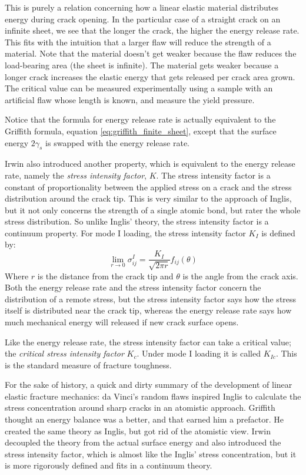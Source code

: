 This is purely a relation concerning how a linear elastic material distributes energy during crack opening. In the particular case of a straight crack on an infinite sheet, we see that the longer the crack, the higher the energy release rate. This fits with the intuition that a larger flaw will reduce the strength of a material. Note that the material doesn't get weaker because the flaw reduces the load-bearing area (the sheet is infinite). The material gets weaker because a longer crack increases the elastic energy that gets released per crack area grown. The critical value can be measured experimentally using a sample with an artificial flaw whose length is known, and measure the yield pressure. 

Notice that the formula for energy release rate is actually equivalent to the Griffith formula, equation \ref{eq:griffith_finite_sheet}, except that the surface energy $2\gamma_s$ is swapped with the energy release rate.

Irwin also introduced another property, which is equivalent to the energy release rate, namely the \emph{stress intensity factor}, $K$. The stress intensity factor is a constant of proportionality between the applied stress on a crack and the stress distribution around the crack tip. This is very similar to the approach of Inglis, but it not only concerns the strength of a single atomic bond, but rater the whole stress distribution. So unlike Inglis' theory, the stress intensity factor is a continuum property. For mode I loading, the stress intensity factor $K_I$ is defined by:
\begin{equation}
	\lim_{r \to 0} \sigma_{ij}^I = \frac{K_I}{\sqrt{2\pi r}} f_{ij}(\theta)
\end{equation}
Where $r$ is the distance from the crack tip and $\theta$ is the angle from the crack axis. Both the energy release rate and the stress intensity factor concern the distribution of a remote stress, but the stress intensity factor says how the stress itself is distributed near the crack tip, whereas the energy release rate says how much mechanical energy will released if new crack surface opens. 

Like the energy release rate, the stress intensity factor can take a critical value; the \emph{critical stress intensity factor} $K_c$. Under mode I loading it is called $K_{Ic}$. This is the standard measure of fracture toughness.

For the sake of history, a quick and dirty summary of the development of linear elastic fracture mechanics: da Vinci's random flaws inspired Inglis to calculate the stress concentration around sharp cracks in an atomistic approach. Griffith thought an energy balance was a better, and that earned him a prefactor. He created the same theory as Inglis, but got rid of the atomistic view. Irwin decoupled the theory from the actual surface energy and also introduced the stress intensity factor, which is almost like the Inglis' stress concentration, but it is more rigorously defined and fits in a continuum theory.

